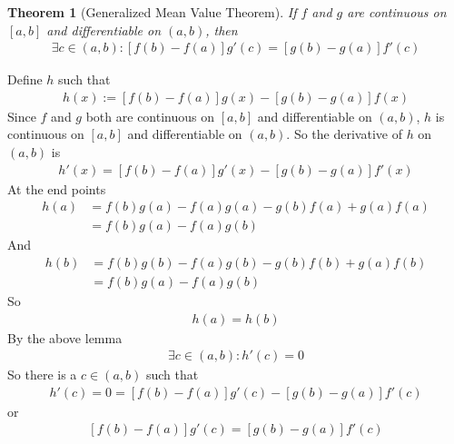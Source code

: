 \documentclass{amsart}
\numberwithin{equation}{section}
\let\oldendproof\endproof
\renewenvironment{proof}[1][\proofname]{%
  \setcounter{case}{0}
  \setcounter{step}{0}
  \oldproof[#1]%
}{\oldendproof}
\theoremstyle{plain}
\newtheorem{theorem}{Theorem}[section]
\theoremstyle{definition}
\theoremstyle{remark}
\begin{document}
\begin{theorem}[Generalized Mean Value Theorem]
  If $f$ and $g$ are continuous on $[a,b]$ and differentiable on $(a,b)$, then
  \begin{align}
    \exists c\in (a,b) : \left[f(b)-f(a)\right] g'(c) = \left[g(b)-g(a)\right] f'(c)
  \end{align}
\end{theorem}
\begin{proof}
  Define $h$ such that
  \begin{align}
    h(x):= \left[f(b)-f(a)\right] g(x) - \left[ g(b) - g(a) \right] f(x)
  \end{align}
  Since $f$ and $g$ both are continuous on $[a,b]$ and differentiable on $(a,b)$, $h$ is continuous on $[a,b]$ and differentiable on $(a,b)$. So the derivative of $h$ on $(a,b)$ is
  \begin{align}
    h'(x) = \left[f(b)-f(a)\right] g'(x) - \left[ g(b) - g(a) \right] f'(x)
  \end{align}
  At the end points
  \begin{align}
    h(a) &= f(b) g(a) - f(a) g(a) - g(b) f(a) +g(a)f(a)\nonumber\\
    &=f(b)g(a) - f(a) g(b)\nonumber
  \end{align}
  And
  \begin{align}
    h(b) &= f(b) g(b) - f(a) g(b) - g(b) f(b) + g(a) f(b)\nonumber\\
    &=f(b)g(a) - f(a) g(b)
  \end{align}
  So
  \begin{align}
    h(a)=h(b)
  \end{align}
  By the above lemma
  \begin{align}
    \exists c\in(a,b) : h'(c) =0
  \end{align}
  So there is a $c\in(a,b)$ such that
  \begin{align}
    h'(c) = 0 = \left[f(b)-f(a)\right] g'(c) - \left[ g(b) - g(a) \right] f'(c)
  \end{align}
  or
  \begin{align}
    \left[f(b)-f(a)\right] g'(c) = \left[ g(b) - g(a) \right] f'(c)
  \end{align}
\end{proof}
\end{document}
